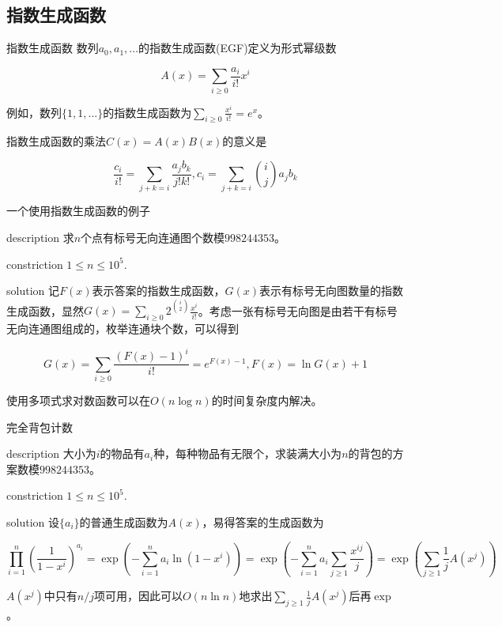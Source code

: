 \documentclass{beamer}
\begin{document}
	\subsection{指数生成函数}
	\begin{frame}{指数生成函数}
		数列$a_0,a_1,...$的指数生成函数(EGF)定义为形式幂级数

		$$A(x)=\sum_{i\ge 0}\frac{a_i}{i!}x^i$$
		
		例如，数列$\{1,1,...\}$的指数生成函数为$\sum_{i\ge 0}\frac{x^i}{i!}=e^x$。
		
		指数生成函数的乘法$C(x)=A(x)B(x)$的意义是
		
		$$\frac{c_i}{i!}=\sum_{j+k=i}\frac{a_jb_k}{j!k!},c_i=\sum_{j+k=i}\binom{i}{j}a_jb_k$$
	\end{frame}
	\begin{frame}{一个使用指数生成函数的例子}
		\begin{block}{description}
			求$n$个点有标号无向连通图个数模$998244353$。
		\end{block}
		\begin{block}{constriction}
			$1 \le n \le 10^5.$
		\end{block}
		\pause
		\begin{block}{solution}
			记$F(x)$表示答案的指数生成函数，$G(x)$表示有标号无向图数量的指数生成函数，显然$G(x)=\sum_{i\ge 0}2^{\binom i2}\frac{x^i}{i!}$。考虑一张有标号无向图是由若干有标号无向连通图组成的，枚举连通块个数，可以得到
			
			$$G(x)=\sum_{i \ge 0}\frac{(F(x)-1)^i}{i!}=e^{F(x)-1},F(x)=\ln G(x) + 1$$
			
			使用多项式求对数函数可以在$O(n\log n)$的时间复杂度内解决。
		\end{block}
	\end{frame}
	\begin{frame}{完全背包计数}
		\begin{block}{description}
			大小为$i$的物品有$a_i$种，每种物品有无限个，求装满大小为$n$的背包的方案数模$998244353$。
		\end{block}
		\begin{block}{constriction}
			$1 \le n \le 10^5.$
		\end{block}
		\pause
		\begin{block}{solution}
			设$\{a_i\}$的普通生成函数为$A(x)$，易得答案的生成函数为
			
			$$\prod_{i=1}^n(\frac{1}{1-x^i})^{a_i}=\exp(-\sum_{i=1}^na_i\ln(1-x^i))=\exp(-\sum_{i=1}^na_i\sum_{j\ge 1}\frac{x^{ij}}{j})=\exp(\sum_{j\ge 1}\frac{1}{j}A(x^j))$$
			
			$A(x^j)$中只有$n/j$项可用，因此可以$O(n\ln n)$地求出$\sum_{j\ge 1}\frac{1}{j}A(x^j)$后再$\exp$。
		\end{block}
	\end{frame}
\end{document}
